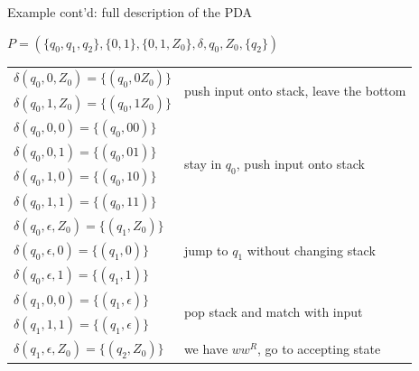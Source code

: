 \documentclass[handout]{beamer}
\begin{document}
\begin{frame}{Example cont'd: full description of the PDA}

    \begin{center}
        $P=(\{q_0,q_1,q_2\},\{0,1\},\{0,1,Z_0\},\delta,q_0,Z_0,\{q_2\})$
    \end{center}

    \begin{tabular}{l l}\hline
        $\delta(q_0,0,Z_0)=\{(q_0,0Z_0)\}$ &  
            \multirow{2}{*}{push input onto stack, leave the bottom} \\
        $\delta(q_0,1,Z_0)=\{(q_0,1Z_0)\}$ &  \\\hline
        $\delta(q_0,0,0)=\{(q_0,00)\}$ &  
            \multirow{4}{*}{stay in $q_0$, push input onto stack}\\ 
        $\delta(q_0,0,1)=\{(q_0,01)\}$ \\
        $\delta(q_0,1,0)=\{(q_0,10)\}$ \\
        $\delta(q_0,1,1)=\{(q_0,11)\}$ \\ \hline
        $\delta(q_0,\epsilon,Z_0)=\{(q_1,Z_0)\}$ &
            \multirow{3}{*}{jump to $q_1$ without changing stack}\\ 
        $\delta(q_0,\epsilon,0)=\{(q_1,0)\}$ \\
        $\delta(q_0,\epsilon,1)=\{(q_1,1)\}$ \\ \hline
        $\delta(q_1,0,0)=\{(q_1,\epsilon)\}$ &
            \multirow{2}{*}{pop stack and match with input}\\ 
        $\delta(q_1,1,1)=\{(q_1,\epsilon)\}$ \\ \hline
        $\delta(q_1,\epsilon,Z_0)=\{(q_2,Z_0)\}$ & we have $ww^R$, go to accepting state
        \\\hline
        \end{tabular}

\end{frame}
\end{document}
